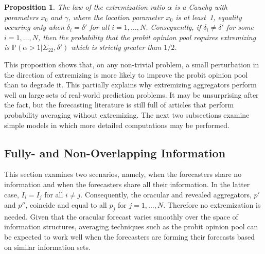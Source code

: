 \documentclass[11pt]{article}
\renewcommand{\P}{\mathbb{P}}
\newtheorem{proposition}[theorem]{Proposition}
\theoremstyle{definition}
\theoremstyle{definition}
\def\P{{\mathbb P}}
\begin{document}
\begin{proposition}
\label{positiveProbThm}
The law of the extremization ratio $\alpha$ is a Cauchy with 
parameters $x_0$ and $\gamma$, where the location parameter 
$x_0$ is at least~1, equality occuring only when $\delta_i = \delta'$ 
for all $i = 1, \dots, N$. Consequently, if $\delta_i \neq \delta'$ 
for some $i = 1, \dots, N$, then the probability that the probit 
opinion pool requires extremizing is $\P(\alpha > 1 | \Sigma_{22}, \delta')$
which is strictly greater than $1/2$. 
\end{proposition}
\noindent
This proposition shows that, on any non-trivial problem, a small
perturbation in the direction of extremizing is more likely to 
improve the probit opinion pool than to degrade it.  This partially 
explains why extremizing aggregators perform well on large sets of 
real-world prediction problems.  It may be unsurprising after the fact,
but the forecasting literature is still full of articles that perform 
probability averaging without extremizing.  The next two 
subsections examine simple models in which more detailed 
computations may be performed.  

\subsection{Fully- and Non-Overlapping Information}
\label{disjoint}
This section examines two scenarios, namely, when the forecasters share no information and when the forecasters share all their information. In the latter case, $I_{i} = I_j$ for all $i \neq j$. Consequently, the oracular and revealed aggregators, $p'$ and $p''$, coincide and equal to all $p_j$ for $j = 1, \dots, N$. Therefore no extremization is needed. Given that the oracular forecast varies smoothly over the space of  information structures, averaging techniques such as the probit opinion pool can be expected to work well when the forecasters are forming their forecasts based on similar information sets.
\end{document}
